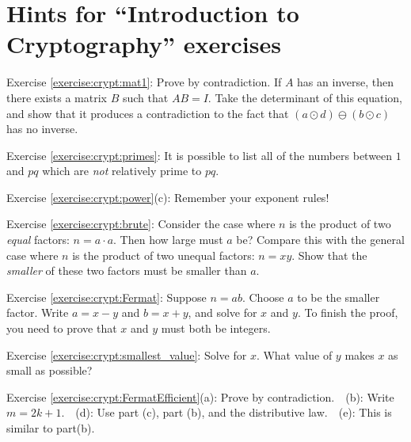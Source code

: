 \section{Hints for ``Introduction to Cryptography'' exercises}\label{sec:crypt:hints}

\noindent Exercise \ref{exercise:crypt:mat1}: Prove by contradiction.  If $A$ has an inverse, then there exists a matrix $B$ such that $AB = I$.  Take the determinant of this equation, and show that it produces a contradiction to the fact that $(a \odot d)  \ominus (b \odot c)$ has no inverse.

\noindent Exercise \ref{exercise:crypt:primes}: It is possible to list all of the numbers between $1$ and $pq$ which are \emph{not} relatively prime to $pq$.

\noindent Exercise \ref{exercise:crypt:power}(c): Remember your exponent rules!

\noindent Exercise \ref{exercise:crypt:brute}: Consider the case where $n$ is the product of two \emph{equal} factors:  $n=a \cdot a$. Then how large must $a$ be?  Compare this with the general case where $n$ is the product of two unequal factors:  $n = xy$. Show that the \emph{smaller} of these two factors must be smaller than $a$.

\noindent Exercise \ref{exercise:crypt:Fermat}: Suppose $n=ab$. Choose $a$ to be the smaller factor.  Write $a = x-y$ and $b = x+y$, and solve for $x$ and $y$. To finish the proof, you need to prove that $x$ and $y$ must both be integers.

\noindent Exercise \ref{exercise:crypt:smallest_value}: Solve for $x$. What value of $y$ makes $x$ as small as possible?

\noindent Exercise \ref{exercise:crypt:FermatEfficient}(a): Prove by contradiction.~~(b): Write $m = 2k+1$.~~(d): Use part (c), part (b), and the distributive law.~~(e): This is similar to part(b).